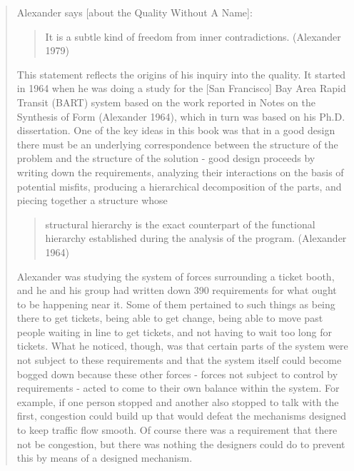 \begin{quote}
Alexander says [about the Quality Without A Name]:
\begin{quote}
It is a subtle kind of freedom from inner contradictions. (Alexander 1979)                                                                          \end{quote}
This statement reflects the origins of his inquiry into the quality. It started in 1964 when he was doing a study for the [San Francisco] Bay Area Rapid Transit (BART) system based on the work reported in Notes on the Synthesis of Form (Alexander 1964), which in turn was based on his Ph.D. dissertation. One of the key ideas in this book was that in a good design there must be an underlying correspondence between the structure of the problem and the structure of the solution - good design proceeds by writing down the requirements, analyzing their interactions on the basis of potential misfits, producing a hierarchical decomposition of the parts, and piecing together a structure whose
\begin{quote}
structural hierarchy is the exact counterpart of the functional hierarchy established during the analysis of the program. (Alexander 1964)\end{quote} 
Alexander was studying the system of forces surrounding a ticket booth, and he and his group had written down 390 requirements for what ought to be happening near it. Some of them pertained to such things as being there to get tickets, being able to get change, being able to move past people waiting in line to get tickets, and not having to wait too long for tickets. What he noticed, though, was that certain parts of the system were not subject to these requirements and that the system itself could become bogged down because these other forces - forces not subject to control by requirements - acted to come to their own balance within the system. For example, if one person stopped and another also stopped to talk with the first, congestion could build up that would defeat the mechanisms designed to keep traffic flow smooth. Of course there was a requirement that there not be congestion, but there was nothing the designers could do to prevent this by means of a designed mechanism.                                                                                                                                                                                                                                                                                                                                                                                                                                                                                                                                                                                                                                                                                                                                                                                                                                                                                                                                                                                                                                 \end{quote} 
